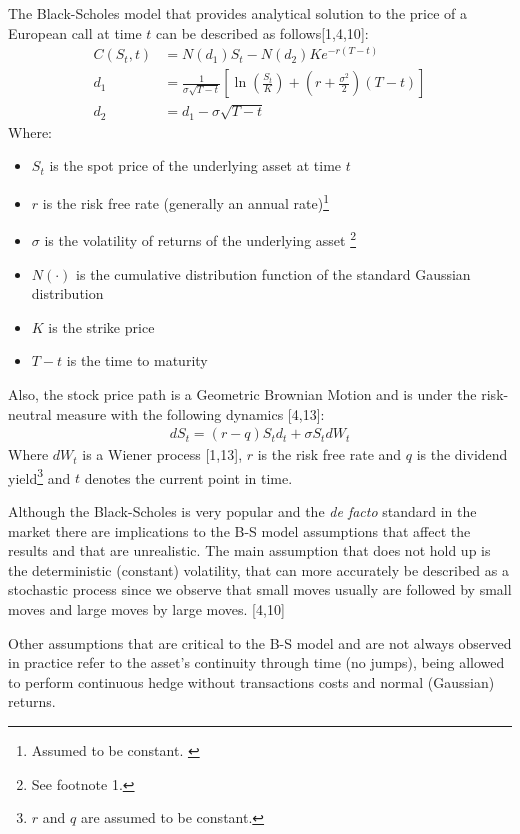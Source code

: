 \documentclass[12pt,twoside]{reedthesis}
\providecommand{\tightlist}{%
  \setlength{\itemsep}{0pt}\setlength{\parskip}{0pt}}
\theoremstyle{definition}
\theoremstyle{definition}
\theoremstyle{remark}
\begin{document}
  The Black-Scholes model that provides analytical solution to the price
  of a European call at time \(t\) can be described as
  follows{[}1,4,10{]}:
  \begin{align}
  C(S_{t},t)&=N(d_{1})S_{t}-N(d_{2})Ke^{-r(T-t)}\\[10pt]
  d_{1}&={\frac {1}{\sigma {\sqrt {T-t}}}}\left[\ln \left({\frac {S_{t}}{K}}\right)+\left(r+{\frac {\sigma ^{2}}{2}}\right)(T-t)\right]\\[10pt]
  d_{2}&=d_{1}-\sigma {\sqrt {T-t}}
  \end{align}
  \noindent
  Where:
  \begin{itemize}
  \tightlist
  \item
    \(S_{t}\) is the spot price of the underlying asset at time \(t\)
  \item
    \(r\) is the risk free rate (generally an annual
    rate)\footnote{Assumed to be constant. \label{teste}}
  \item
    \(\sigma\) is the volatility of returns of the underlying asset
    \footnote{See footnote 1.}
  \item
    \(N(\cdot )\) is the cumulative distribution function of the standard
    Gaussian distribution
  \item
    \(K\) is the strike price
  \item
    \(T-t\) is the time to maturity
  \end{itemize}
  \noindent
  Also, the stock price path is a Geometric Brownian Motion and is under
  the risk-neutral measure with the following dynamics {[}4,13{]}:
  \begin{align}
  dS_{t} = (r-q)S_td_t+\sigma S_t dW_t
  \end{align}
  \noindent
  Where \(dW_t\) is a Wiener process {[}1,13{]}, \(r\) is the risk free
  rate and \(q\) is the dividend
  yield\footnote{$r$ and $q$ are assumed to be constant.} and \(t\)
  denotes the current point in time.
  
  Although the Black-Scholes is very popular and the \emph{de facto}
  standard in the market there are implications to the B-S model
  assumptions that affect the results and that are unrealistic. The main
  assumption that does not hold up is the deterministic (constant)
  volatility, that can more accurately be described as a stochastic
  process since we observe that small moves usually are followed by small
  moves and large moves by large moves. {[}4,10{]}
  
  Other assumptions that are critical to the B-S model and are not always
  observed in practice refer to the asset's continuity through time (no
  jumps), being allowed to perform continuous hedge without transactions
  costs and normal (Gaussian) returns.
  
\end{document}
